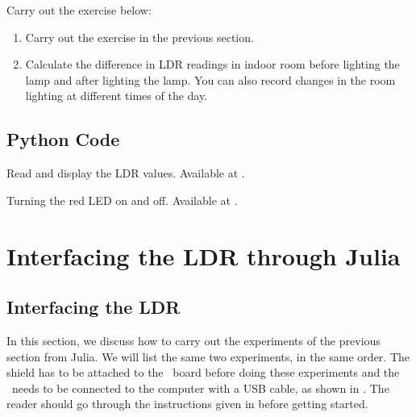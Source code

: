 \begin{exercise}
Carry out the exercise below:
\begin{enumerate}
\item Carry out the exercise in the previous section. 
\item Calculate the difference in LDR readings in indoor room
  before lighting the lamp and after lighting the lamp. You can also
  record changes in the room lighting at different times of the day.
\end{enumerate}
\end{exercise}

\subsection{Python Code}
\label{sec:ldr-python-code}

\begin{pycode}
{Read and display the LDR values.  Available at
  .}
\label{py:ldr-read}

\end{pycode}

\begin{pycode}
{Turning the red LED on and off.  Available at
  .}
\label{py:ldr-led}

\end{pycode}

\section{Interfacing the LDR through Julia}
\subsection{Interfacing the LDR}
In this section, we discuss how to carry out the experiments of the
previous section from Julia.  We will list the same two experiments,
in the same order.  The shield has to be attached to the \arduino\ board
before doing these experiments and the \arduino\ needs to be connected to the computer 
with a USB cable, as shown in .
The reader should go through the instructions given in  before getting started.



